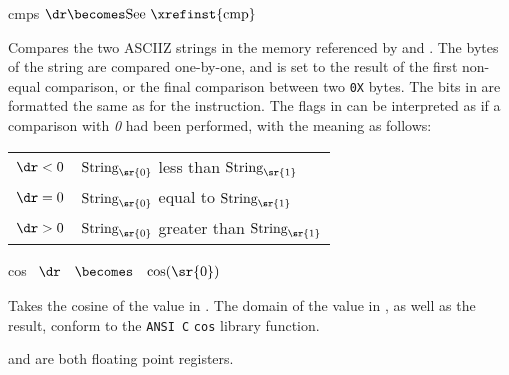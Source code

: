 \begin{instruction}{cmps}
     {\rcmpsopc}
     {
       $\dr \becomes \textrm{See \xrefinst{cmp}}$
     }
     {
       Compares the two \acs{ASCIIZ} strings in the memory referenced
       by  and .  The bytes of the string are compared
       one-by-one, and \dr is set to the result of the first non-equal
       comparison, or the final comparison between two \texttt{0X} bytes.
       The bits in \dr are formatted the same as for the 
       instruction.  The flags in \dr can be interpreted as if a comparison
       with \emph{0} had been performed, with the meaning as follows:

       \begin{tabularx}{\linewidth}{ll}
         $\dr < 0$ & $\textrm{String}_{\sr{0}}$ less than $\textrm{String}_{\sr{1}}$ \\
         $\dr = 0$ & $\textrm{String}_{\sr{0}}$ equal to $\textrm{String}_{\sr{1}}$ \\
         $\dr > 0$ & $\textrm{String}_{\sr{0}}$ greater than $\textrm{String}_{\sr{1}}$ \\
       \end{tabularx}
     }
\end{instruction}


\begin{instruction}{cos}
     {\cosopc}
     {
       \begin{math}
         \begin{array}{lcl}
           \dr & \becomes & \cos(\sr{0})
         \end{array}
       \end{math}
     }
     {Takes the cosine of the value in .  The domain of the
     value in \texttt{}, as well as the result, conform to
     the \texttt{ANSI C} \texttt{cos} library function.

      and \dr are both floating point registers.}
\end{instruction}


%
%



